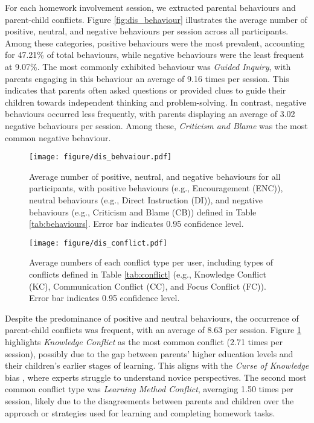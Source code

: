 For each homework involvement session, we extracted parental behaviours and parent-child conflicts. Figure \ref{fig:dis_behaviour}
illustrates the average number of positive, neutral, and negative behaviours per session across all participants. Among these categories, positive behaviours were the most prevalent, accounting for 47.21\% of total behaviours, while negative behaviours were the least frequent at 9.07\%. The most commonly exhibited behaviour was \textit{Guided Inquiry}, with parents engaging in this behaviour an average of 9.16 times per session. This indicates that parents often asked questions or provided clues to guide their children towards independent thinking and problem-solving. In contrast, negative behaviours occurred less frequently, with parents displaying an average of 3.02 negative behaviours per session. Among these, \textit{Criticism and Blame} was the most common negative behaviour.

\begin{figure}
    \centering
    \begin{minipage}[t]{0.525\textwidth}
        \texttt{[image: figure/dis\_behvaiour.pdf]}
        \caption{Average number of positive, neutral, and negative behaviours for all participants, with positive behaviours (e.g., Encouragement
(ENC)), neutral behaviours (e.g., Direct
Instruction (DI)), and negative behaviours (e.g., Criticism and
Blame (CB)) defined in Table \ref{tab:behaviours}. Error bar indicates 0.95 confidence level.}
        \label{fig:dis_behaviour}
    \end{minipage}
    \hspace{0.2cm}
    \begin{minipage}[t]{0.445\textwidth}
    \centering
        \texttt{[image: figure/dis\_conflict.pdf]}
        \caption{Average numbers of each conflict type per user, including types of conflicts defined in Table \ref{tab:conflict} (e.g., Knowledge Conflict (KC), Communication Conflict (CC), and Focus Conflict
(FC)). Error bar indicates 0.95 confidence level.}
        \label{fig:dis_conflict}
    \end{minipage}
    
\end{figure}


Despite the predominance of positive and neutral behaviours, the occurrence of parent-child conflicts was frequent, with an average of 8.63 per session. Figure \ref{fig:dis_conflict} highlights \textit{Knowledge Conflict} as the most common conflict (2.71 times per session), possibly due to the gap between parents’ higher education levels and their children’s earlier stages of learning. This aligns with the \textit{Curse of Knowledge} bias \cite{birch2007curse}, where experts struggle to understand novice perspectives. The second most common conflict type was \textit{Learning Method Conflict}, averaging 1.50 times per session, likely due to the disagreements between parents and children over the approach or strategies used for learning and completing homework tasks. 

